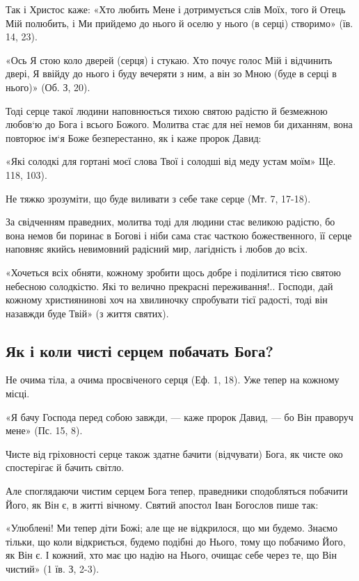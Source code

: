 \documentclass[main.tex]{subfiles}
\begin{document}
Так і Христос каже: «Хто любить Мене і дотримується слів Моїх, того й Отець Мій полюбить, і Ми прийдемо до нього й оселю у нього (в серці) створимо» (їв. 14, 23).

«Ось Я стою коло дверей (серця) і стукаю. Хто почує голос Мій і відчинить двері, Я ввійду до нього і буду вечеряти з ним, а він зо Мною (буде в серці в нього)» (Об. З, 20).

Тоді серце такої людини наповнюється тихою святою радістю й безмежною любов`ю до Бога і всього Божого. Молитва стає для неї немов би диханням, вона повторює ім`я Боже безперестанно, як і каже пророк Давид:

«Які солодкі для гортані моєї слова Твої і солодші від меду устам моїм» Ще. 118, 103).

Не тяжко зрозуміти, що буде виливати з себе таке серце (Мт. 7, 17-18).

За свідченням праведних, молитва тоді для людини стає великою радістю, бо вона немов би поринає в Богові і ніби сама стає часткою божественного, її серце наповняє якийсь невимовний радісний мир, лагідність і любов до всіх.

«Хочеться всіх обняти, кожному зробити щось добре і поділитися тією святою небесною солодкістю. Які то велично прекрасні переживання!.. Господи, дай кожному християнинові хоч на хвилиночку спробувати тієї радості, тоді він назавжди буде Твій» (з життя святих).

\subsection{Як і коли чисті серцем побачать Бога?}

Не очима тіла, а очима просвіченого серця (Еф. 1, 18). Уже тепер на кожному місці.
 
«Я бачу Господа перед собою завжди, — каже пророк Давид, — бо Він праворуч мене» (Пс. 15, 8).

Чисте від гріховності серце також здатне бачити (відчувати) Бога, як чисте око спостерігає й бачить світло.

Але споглядаючи чистим серцем Бога тепер, праведники сподобляться побачити Його, як Він є, в житті вічному. Святий апостол Іван Богослов пише так:

«Улюблені! Ми тепер діти Божі; але ще не відкрилося, що ми будемо. Знаємо тільки, що коли відкриється, будемо подібні до Нього, тому що побачимо Його, як Він є. І кожний, хто має цю надію на Нього, очищає себе через те, що Він чистий» (1 їв. З, 2-3).
\end{document}
